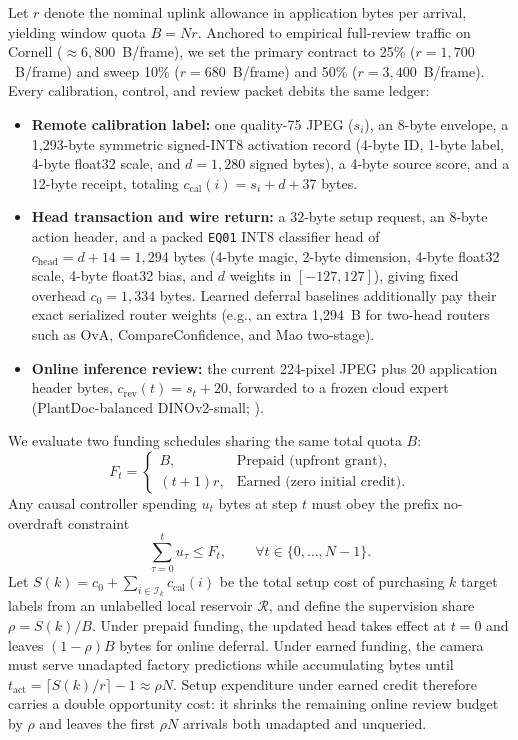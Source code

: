 \documentclass[preprint,12pt,authoryear]{elsarticle}
\begin{document}
Let $r$ denote the nominal uplink allowance in application bytes per arrival, yielding window quota $B = Nr$. Anchored to empirical full-review traffic on Cornell ($\approx 6{,}800$~B/frame), we set the primary contract to 25\% ($r = 1{,}700$~B/frame) and sweep 10\% ($r = 680$~B/frame) and 50\% ($r = 3{,}400$~B/frame). Every calibration, control, and review packet debits the same ledger:
\begin{itemize}
  \item \textbf{Remote calibration label:} one quality-75 JPEG ($s_i$), an 8-byte envelope, a 1,293-byte symmetric signed-INT8 activation record (4-byte ID, 1-byte label, 4-byte float32 scale, and $d=1{,}280$ signed bytes), a 4-byte source score, and a 12-byte receipt, totaling $c_{\mathrm{cal}}(i) = s_i + d + 37$ bytes.
  \item \textbf{Head transaction and wire return:} a 32-byte setup request, an 8-byte action header, and a packed \texttt{EQ01} INT8 classifier head of $c_{\mathrm{head}} = d + 14 = 1{,}294$ bytes (4-byte magic, 2-byte dimension, 4-byte float32 scale, 4-byte float32 bias, and $d$ weights in $[-127, 127]$), giving fixed overhead $c_0 = 1{,}334$ bytes. Learned deferral baselines additionally pay their exact serialized router weights (e.g., an extra 1,294~B for two-head routers such as OvA, CompareConfidence, and Mao two-stage).
  \item \textbf{Online inference review:} the current 224-pixel JPEG plus 20 application header bytes, $c_{\mathrm{rev}}(t) = s_t + 20$, forwarded to a frozen cloud expert (PlantDoc-balanced DINOv2-small; \citealp{dino}).
\end{itemize}

We evaluate two funding schedules sharing the same total quota $B$:
\begin{equation}
  F_t =
  \begin{cases}
    B, & \text{Prepaid (upfront grant)}, \\
    (t + 1) r, & \text{Earned (zero initial credit)}.
  \end{cases}
  \label{eq:funding}
\end{equation}
Any causal controller spending $u_t$ bytes at step $t$ must obey the prefix no-overdraft constraint
\begin{equation}
  \sum_{\tau=0}^{t} u_\tau \le F_t, \qquad \forall t \in \{0, \dots, N-1\}.
  \label{eq:overdraft}
\end{equation}
Let $S(k) = c_0 + \sum_{i \in \mathcal{I}_k} c_{\mathrm{cal}}(i)$ be the total setup cost of purchasing $k$ target labels from an unlabelled local reservoir $\mathcal{R}$, and define the supervision share $\rho = S(k)/B$. Under prepaid funding, the updated head takes effect at $t = 0$ and leaves $(1-\rho)B$ bytes for online deferral. Under earned funding, the camera must serve unadapted factory predictions while accumulating bytes until $t_{\mathrm{act}} = \lceil S(k)/r \rceil - 1 \approx \rho N$. Setup expenditure under earned credit therefore carries a double opportunity cost: it shrinks the remaining online review budget by $\rho$ and leaves the first $\rho N$ arrivals both unadapted and unqueried.
\end{document}
